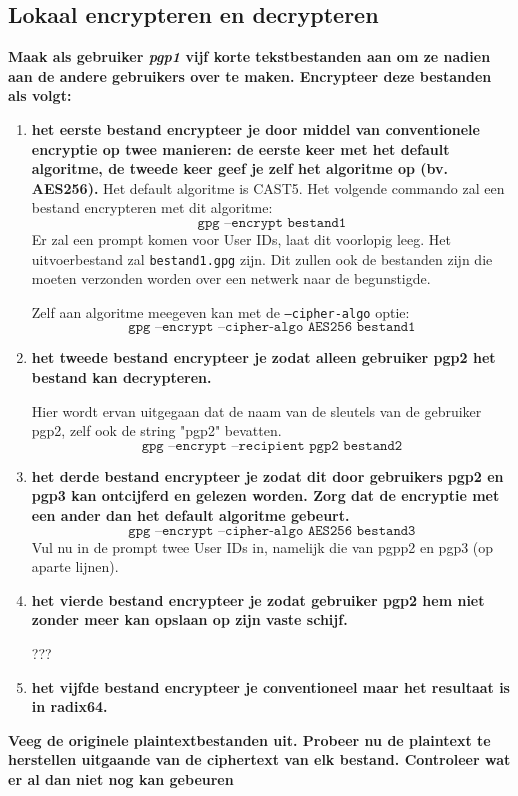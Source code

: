 \documentclass{report}
\begin{document}
\subsection{Lokaal encrypteren en decrypteren}
\textbf{Maak als gebruiker \textit{pgp1} vijf korte tekstbestanden aan om ze nadien aan de andere gebruikers over te maken. Encrypteer deze bestanden als volgt: }
\begin{enumerate}
	\item \textbf{het eerste bestand encrypteer je door middel van conventionele encryptie op twee manieren:
		de eerste keer met het default algoritme,
		de tweede keer geef je zelf het algoritme op (bv. AES256). }
	Het default algoritme is CAST5. Het volgende commando zal een bestand encrypteren met dit algoritme:
	$$\texttt{gpg --encrypt bestand1}$$
	Er zal een prompt komen voor User IDs, laat dit voorlopig leeg. Het uitvoerbestand zal \texttt{bestand1.gpg} zijn. Dit zullen ook de bestanden zijn die moeten verzonden worden over een netwerk naar de begunstigde.
	
	
	Zelf aan algoritme meegeven kan met de \texttt{--cipher-algo} optie:
	$$\texttt{gpg --encrypt --cipher-algo AES256 bestand1}$$
	
	\item \textbf{het tweede bestand encrypteer je zodat alleen gebruiker pgp2 het bestand kan decrypteren.}
	
	Hier wordt ervan uitgegaan dat de naam van de sleutels van de gebruiker pgp2, zelf ook de string "pgp2" bevatten.
	$$\texttt{gpg --encrypt --recipient pgp2 bestand2}$$
	
	\item \textbf{het derde bestand encrypteer je zodat dit door gebruikers pgp2 en pgp3 kan ontcijferd en gelezen worden. Zorg dat de encryptie met een ander dan het default algoritme gebeurt.}
	$$\texttt{gpg --encrypt --cipher-algo AES256 bestand3}$$
	Vul nu in de prompt twee User IDs in, namelijk die van pgpp2 en pgp3 (op aparte lijnen).
	
	\item \textbf{het vierde bestand encrypteer je zodat gebruiker pgp2 hem niet zonder meer kan opslaan op zijn vaste schijf.}
	
	???
	
	\item \textbf{het vijfde bestand encrypteer je conventioneel maar het resultaat is in radix64.}
\end{enumerate}

\textbf{Veeg de originele plaintextbestanden uit. Probeer nu de plaintext te herstellen uitgaande van de ciphertext van elk bestand. Controleer wat er al dan niet nog kan gebeuren}
\end{document}
